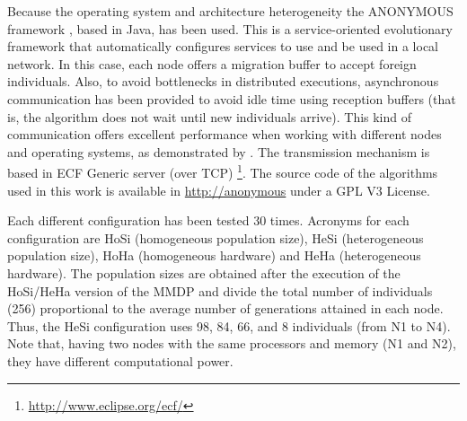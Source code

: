 \documentclass{sig-alternate}
\begin{document}
\begin{table*}
\label{tab:computers}
\end{table*}

Because the operating system and architecture heterogeneity the ANONYMOUS framework \cite{OSGILIATH}, based in Java, has been used. This is a service-oriented evolutionary framework that automatically configures services to use and be used in a local network. In this case, each node offers a migration buffer to accept foreign individuals. Also, to avoid bottlenecks in distributed executions, asynchronous communication has been provided to avoid idle time using reception buffers (that is, the algorithm does not wait until new individuals arrive). This kind of communication offers excellent performance when working with different nodes and operating systems, as demonstrated by \cite{HETEROGENEOUSHARD}. The transmission mechanism is based in ECF Generic server (over TCP) \footnote{\url{http://www.eclipse.org/ecf/}}. The source code of the algorithms used in this work is available in \url{http://anonymous} under a GPL V3 License.

Each different configuration has been tested 30 times. Acronyms for each configuration are HoSi (homogeneous population size), HeSi (heterogeneous population size), HoHa (homogeneous hardware) and HeHa (heterogeneous hardware). The population sizes are obtained after the execution of the HoSi/HeHa version of the MMDP and divide the total number of individuals (256) proportional to the average number of generations attained in each node. Thus, the HeSi configuration uses 98, 84, 66, and 8 individuals (from N1 to N4). Note that, having two nodes with the same processors and memory (N1 and N2), they have different computational power.
\end{document}
